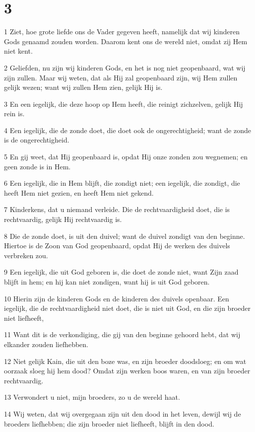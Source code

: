 \chapter{3}

\par 1 Ziet, hoe grote liefde ons de Vader gegeven heeft, namelijk dat wij kinderen Gods genaamd zouden worden. Daarom kent ons de wereld niet, omdat zij Hem niet kent.
\par 2 Geliefden, nu zijn wij kinderen Gods, en het is nog niet geopenbaard, wat wij zijn zullen. Maar wij weten, dat als Hij zal geopenbaard zijn, wij Hem zullen gelijk wezen; want wij zullen Hem zien, gelijk Hij is.
\par 3 En een iegelijk, die deze hoop op Hem heeft, die reinigt zichzelven, gelijk Hij rein is.
\par 4 Een iegelijk, die de zonde doet, die doet ook de ongerechtigheid; want de zonde is de ongerechtigheid.
\par 5 En gij weet, dat Hij geopenbaard is, opdat Hij onze zonden zou wegnemen; en geen zonde is in Hem.
\par 6 Een iegelijk, die in Hem blijft, die zondigt niet; een iegelijk, die zondigt, die heeft Hem niet gezien, en heeft Hem niet gekend.
\par 7 Kinderkens, dat u niemand verleide. Die de rechtvaardigheid doet, die is rechtvaardig, gelijk Hij rechtvaardig is.
\par 8 Die de zonde doet, is uit den duivel; want de duivel zondigt van den beginne. Hiertoe is de Zoon van God geopenbaard, opdat Hij de werken des duivels verbreken zou.
\par 9 Een iegelijk, die uit God geboren is, die doet de zonde niet, want Zijn zaad blijft in hem; en hij kan niet zondigen, want hij is uit God geboren.
\par 10 Hierin zijn de kinderen Gods en de kinderen des duivels openbaar. Een iegelijk, die de rechtvaardigheid niet doet, die is niet uit God, en die zijn broeder niet liefheeft,
\par 11 Want dit is de verkondiging, die gij van den beginne gehoord hebt, dat wij elkander zouden liefhebben.
\par 12 Niet gelijk Kain, die uit den boze was, en zijn broeder doodsloeg; en om wat oorzaak sloeg hij hem dood? Omdat zijn werken boos waren, en van zijn broeder rechtvaardig.
\par 13 Verwondert u niet, mijn broeders, zo u de wereld haat.
\par 14 Wij weten, dat wij overgegaan zijn uit den dood in het leven, dewijl wij de broeders liefhebben; die zijn broeder niet liefheeft, blijft in den dood.

